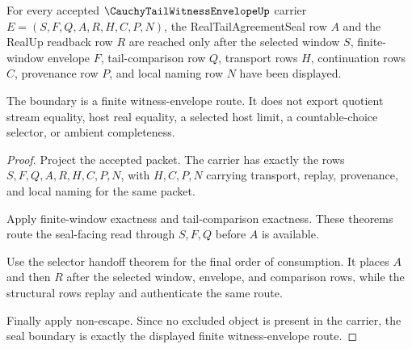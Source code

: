 \begin{theorem}
\label{thm:cauchy-tail-witness-envelope-real-tail-seal-boundary}
For every accepted $\CauchyTailWitnessEnvelopeUp$ carrier $E=(S,F,Q,A,R,H,C,P,N)$, the RealTailAgreementSeal row $A$ and the RealUp readback row $R$ are reached only after the selected window $S$, finite-window envelope $F$, tail-comparison row $Q$, transport rows $H$, continuation rows $C$, provenance row $P$, and local naming row $N$ have been displayed.

The boundary is a finite witness-envelope route. It does not export quotient stream equality, host real equality, a selected host limit, a countable-choice selector, or ambient completeness.
\end{theorem}
\begin{proof}
Project the accepted packet. The carrier has exactly the rows $S,F,Q,A,R,H,C,P,N$, with $H,C,P,N$ carrying transport, replay, provenance, and local naming for the same packet.

Apply finite-window exactness and tail-comparison exactness. These theorems route the seal-facing read through $S,F,Q$ before $A$ is available.

Use the selector handoff theorem for the final order of consumption. It places $A$ and then $R$ after the selected window, envelope, and comparison rows, while the structural rows replay and authenticate the same route.

Finally apply non-escape. Since no excluded object is present in the carrier, the seal boundary is exactly the displayed finite witness-envelope route.
\end{proof}

